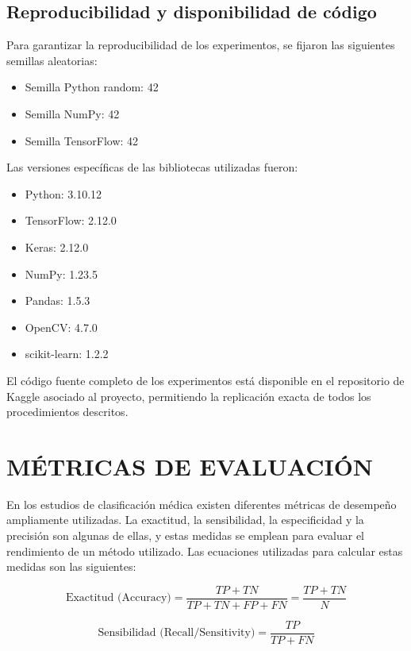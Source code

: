 \subsection{Reproducibilidad y disponibilidad de código}

Para garantizar la reproducibilidad de los experimentos, se fijaron las siguientes semillas aleatorias:

\begin{itemize}
    \item Semilla Python random: 42
    \item Semilla NumPy: 42
    \item Semilla TensorFlow: 42
\end{itemize}

Las versiones específicas de las bibliotecas utilizadas fueron:
\begin{itemize}
    \item Python: 3.10.12
    \item TensorFlow: 2.12.0
    \item Keras: 2.12.0
    \item NumPy: 1.23.5
    \item Pandas: 1.5.3
    \item OpenCV: 4.7.0
    \item scikit-learn: 1.2.2
\end{itemize}

El código fuente completo de los experimentos está disponible en el repositorio de Kaggle asociado al proyecto, permitiendo la replicación exacta de todos los procedimientos descritos.

\section{MÉTRICAS DE EVALUACIÓN}

En los estudios de clasificación médica existen diferentes métricas de desempeño ampliamente utilizadas. La exactitud, la sensibilidad, la especificidad y la precisión son algunas de ellas, y estas medidas se emplean para evaluar el rendimiento de un método utilizado. Las ecuaciones utilizadas para calcular estas medidas son las siguientes:

\begin{equation}
	\text{Exactitud (Accuracy)} = \frac{TP + TN}{TP + TN + FP + FN} = \frac{TP + TN}{N}
\end{equation}

\begin{equation}
	\text{Sensibilidad (Recall/Sensitivity)} = \frac{TP}{TP + FN}
\end{equation}

